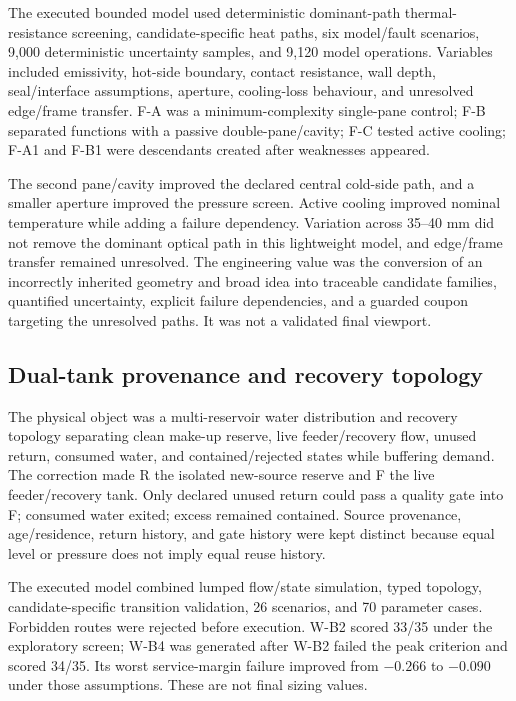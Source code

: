The executed bounded model used deterministic dominant-path thermal-resistance screening, candidate-specific heat paths, six model/fault scenarios, 9,000 deterministic uncertainty samples, and 9,120 model operations. Variables included emissivity, hot-side boundary, contact resistance, wall depth, seal/interface assumptions, aperture, cooling-loss behaviour, and unresolved edge/frame transfer. F-A was a minimum-complexity single-pane control; F-B separated functions with a passive double-pane/cavity; F-C tested active cooling; F-A1 and F-B1 were descendants created after weaknesses appeared.

The second pane/cavity improved the declared central cold-side path, and a smaller aperture improved the pressure screen. Active cooling improved nominal temperature while adding a failure dependency. Variation across 35--40 mm did not remove the dominant optical path in this lightweight model, and edge/frame transfer remained unresolved. The engineering value was the conversion of an incorrectly inherited geometry and broad idea into traceable candidate families, quantified uncertainty, explicit failure dependencies, and a guarded coupon targeting the unresolved paths. It was not a validated final viewport.

\subsection{Dual-tank provenance and recovery topology}
The physical object was a multi-reservoir water distribution and recovery topology separating clean make-up reserve, live feeder/recovery flow, unused return, consumed water, and contained/rejected states while buffering demand. The correction made R the isolated new-source reserve and F the live feeder/recovery tank. Only declared unused return could pass a quality gate into F; consumed water exited; excess remained contained. Source provenance, age/residence, return history, and gate history were kept distinct because equal level or pressure does not imply equal reuse history.

The executed model combined lumped flow/state simulation, typed topology, candidate-specific transition validation, 26 scenarios, and 70 parameter cases. Forbidden routes were rejected before execution. W-B2 scored 33/35 under the exploratory screen; W-B4 was generated after W-B2 failed the peak criterion and scored 34/35. Its worst service-margin failure improved from $-0.266$ to $-0.090$ under those assumptions. These are not final sizing values.

